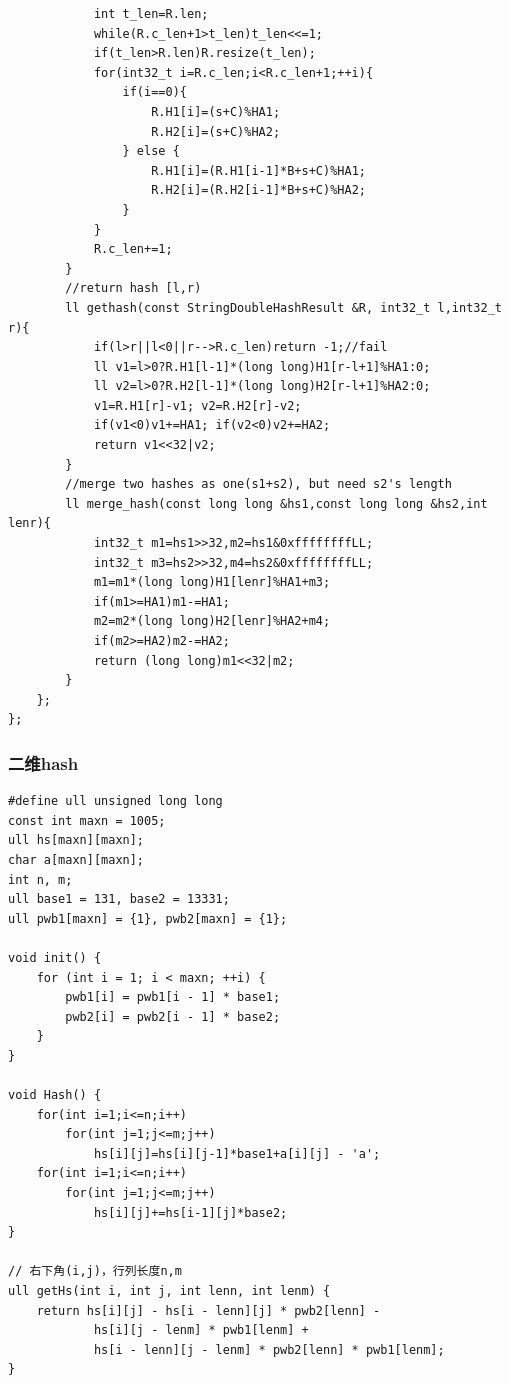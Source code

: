 \documentclass[twoside]{article}
\begin{document}
\begin{lstlisting}
            int t_len=R.len;
            while(R.c_len+1>t_len)t_len<<=1;
            if(t_len>R.len)R.resize(t_len);
            for(int32_t i=R.c_len;i<R.c_len+1;++i){
                if(i==0){
                    R.H1[i]=(s+C)%HA1;
                    R.H2[i]=(s+C)%HA2;
                } else {
                    R.H1[i]=(R.H1[i-1]*B+s+C)%HA1;
                    R.H2[i]=(R.H2[i-1]*B+s+C)%HA2;
                }
            }
            R.c_len+=1;
        }
        //return hash [l,r)
        ll gethash(const StringDoubleHashResult &R, int32_t l,int32_t r){
            if(l>r||l<0||r-->R.c_len)return -1;//fail
            ll v1=l>0?R.H1[l-1]*(long long)H1[r-l+1]%HA1:0;
            ll v2=l>0?R.H2[l-1]*(long long)H2[r-l+1]%HA2:0;
            v1=R.H1[r]-v1; v2=R.H2[r]-v2;
            if(v1<0)v1+=HA1; if(v2<0)v2+=HA2;
            return v1<<32|v2;
        }
        //merge two hashes as one(s1+s2), but need s2's length
        ll merge_hash(const long long &hs1,const long long &hs2,int lenr){
            int32_t m1=hs1>>32,m2=hs1&0xffffffffLL;
            int32_t m3=hs2>>32,m4=hs2&0xffffffffLL;
            m1=m1*(long long)H1[lenr]%HA1+m3;
            if(m1>=HA1)m1-=HA1;
            m2=m2*(long long)H2[lenr]%HA2+m4;
            if(m2>=HA2)m2-=HA2;
            return (long long)m1<<32|m2;
        }
    };
};\end{lstlisting}
\subsubsection{二维hash}
\begin{lstlisting}
#define ull unsigned long long
const int maxn = 1005;
ull hs[maxn][maxn];
char a[maxn][maxn];
int n, m;
ull base1 = 131, base2 = 13331;
ull pwb1[maxn] = {1}, pwb2[maxn] = {1};

void init() {
    for (int i = 1; i < maxn; ++i) {
        pwb1[i] = pwb1[i - 1] * base1;
        pwb2[i] = pwb2[i - 1] * base2;
    }
}

void Hash() {
    for(int i=1;i<=n;i++)
        for(int j=1;j<=m;j++)
            hs[i][j]=hs[i][j-1]*base1+a[i][j] - 'a';
    for(int i=1;i<=n;i++)
        for(int j=1;j<=m;j++)
            hs[i][j]+=hs[i-1][j]*base2;
}

// 右下角(i,j)，行列长度n,m
ull getHs(int i, int j, int lenn, int lenm) {
    return hs[i][j] - hs[i - lenn][j] * pwb2[lenn] - 
            hs[i][j - lenm] * pwb1[lenm] +
            hs[i - lenn][j - lenm] * pwb2[lenn] * pwb1[lenm];
}\end{lstlisting}
\end{document}
